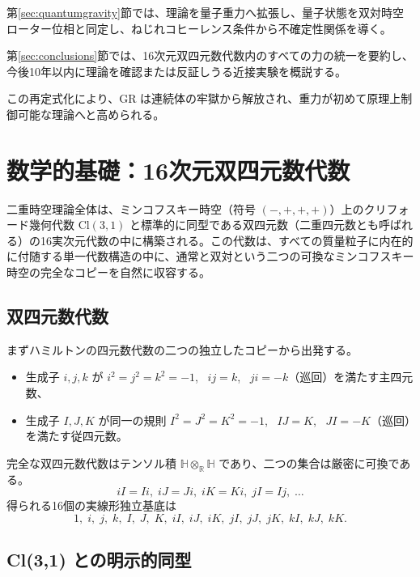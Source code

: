 \documentclass[a4paper]{article}
\begin{document}
第\ref{sec:quantumgravity}節では、理論を量子重力へ拡張し、量子状態を双対時空ローター位相と同定し、ねじれコヒーレンス条件から不確定性関係を導く。

第\ref{sec:conclusions}節では、16次元双四元数代数内のすべての力の統一を要約し、今後10年以内に理論を確認または反証しうる近接実験を概説する。

この再定式化により、GR は連続体の牢獄から解放され、重力が初めて原理上制御可能な理論へと高められる。

\section{数学的基礎：16次元双四元数代数}
\label{sec:math}

二重時空理論全体は、ミンコフスキー時空（符号 $(-,+,+,+)$）上のクリフォード幾何代数 $\mathrm{Cl}(3,1)$ と標準的に同型である双四元数（二重四元数とも呼ばれる）の16実次元代数の中に構築される。この代数は、すべての質量粒子に内在的に付随する単一代数構造の中に、通常と双対という二つの可換なミンコフスキー時空の完全なコピーを自然に収容する。

\subsection{双四元数代数}

まずハミルトンの四元数代数の二つの独立したコピーから出発する。
\begin{itemize}
  \item 生成子 $i,j,k$ が $i^2=j^2=k^2=-1$, \ $ij=k$, \ $ji=-k$（巡回）を満たす主四元数、
  \item 生成子 $I,J,K$ が同一の規則 $I^2=J^2=K^2=-1$, \ $IJ=K$, \ $JI=-K$（巡回）を満たす従四元数。
\end{itemize}
完全な双四元数代数はテンソル積 $\mathbb{H} \otimes_{\mathbb{R}} \mathbb{H}$ であり、二つの集合は厳密に可換である。
\[
iI = Ii,\; iJ = Ji,\; iK = Ki,\; jI = Ij,\; \dots
\]
得られる16個の実線形独立基底は
\[
1,\; i,\; j,\; k,\; I,\; J,\; K,\; iI,\; iJ,\; iK,\; jI,\; jJ,\; jK,\; kI,\; kJ,\; kK.
\]

\subsection{Cl(3,1) との明示的同型}
\end{document}
